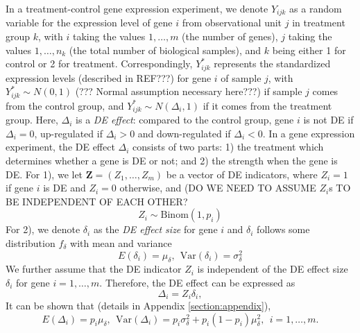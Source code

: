 \documentclass[11pt, a4paper]{article}
\begin{document}
	In a treatment-control gene expression experiment, we denote $Y_{ijk}$ as a random variable for the expression level of gene $i$ from observational unit $j$ in treatment group $k$, with $i$ taking the values $1, \ldots, m$ (the number of genes), $j$ taking the values $1, \ldots, n_k$ (the total number of biological samples), and $k$ being either 1 for control or 2 for treatment. Correspondingly, $Y^{\ast}_{ijk}$ represents the standardized expression levels (described in REF???) for gene $i$ of sample $j$, with $Y^{\ast}_{ijk}\sim N(0, 1)$ (??? Normal assumption necessary here???)  if sample $j$ comes from the control group, and $Y^{\ast}_{ijk}\sim N(\Delta_i, 1)$ if it comes from the treatment group. Here, $\Delta_i$ is a \textit{DE effect}: compared to the control group,  gene $i$ is not DE if $\Delta_i=0$, up-regulated if $\Delta_i >0 $ and down-regulated if $\Delta_i<0$.
	In a gene expression experiment, the DE effect $\Delta_i$ consists of two parts: 1) the treatment which determines whether a gene is DE or not; and 2) the strength when the gene is DE. 
	For 1), we let $\bm Z = (Z_1, \ldots, Z_m)$ be a vector of DE indicators, where $Z_i=1$ if gene $i$ is DE and $Z_i = 0$ otherwise, and (DO WE NEED TO ASSUME $Z_i$s TO BE INDEPENDENT OF EACH OTHER?
	\begin{equation}\label{eq:DEindicator}
		Z_i \sim \text{Binom}(1, p_i)
	\end{equation}
	For 2), we denote $\delta_i$ as the \textit{DE effect size} for gene $i$ and $\delta_i$ follows some distribution $ f_{\delta}$ with mean and variance
	\begin{equation}\label{eq:DEdistribution}
		E(\delta_i) = \mu_{\delta}, ~~\text{Var}(\delta_i) = \sigma^2_{\delta}
	\end{equation}
	We further assume that the DE indicator $Z_i$ is independent of the DE effect size $\delta_i$ for gene $i=1, \ldots, m$.  Therefore, the DE effect can be expressed as
	\begin{equation}\label{eq:DEeffect}
		\Delta_i = Z_i\delta_i,
	\end{equation}
	It can be shown that (details in Appendix \ref{section:appendix}), 
	\begin{equation}\label{eq:deltaMeanVar}
		E(\Delta_i) = p_i\mu_{\delta}, ~~  \text{Var}(\Delta_i)= p_i\sigma_{\delta}^2 + p_i(1-p_i)\mu_{\delta}^2, ~~i = 1, \ldots, m.
	\end{equation}
	
\end{document}
